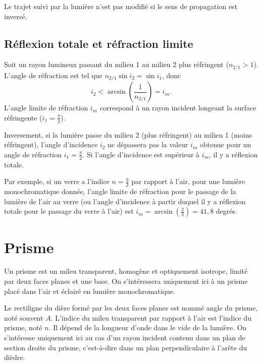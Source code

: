 \begin{theo}
  Le trajet suivi par la lumière n'est pas modifié si le sens de propagation est inversé.
\end{theo}

\subsection{Réflexion totale et réfraction limite}
\label{chap6-subsec:reftotale}
Soit un rayon lumineux passant du milieu 1 au milieu 2 plus réfringent ($n_{2/1}>1$). L'angle de réfraction est tel que $n_{2/1} \sin i_2 = \sin i_1$, donc
\begin{equation}
  i_2 < \arcsin \left(\frac{1}{n_{2/1}} \right) = i_m.
\end{equation}
L'angle limite de réfraction $i_m$ correspond à un rayon incident longeant la surface réfringente ($i_1 = \frac{\pi}{2}$).

Inversement, si la lumière passe du milieu 2 (plus réfringent) au milieu 1 (moins réfringent), l'angle d'incidence $i_2$ ne dépassera pas la valeur $i_m$ obtenue pour un angle de réfraction $i_1 = \frac{\pi}{2}$. Si l'angle d'incidence est supérieur à $i_m$, il y a réflexion totale.

Par exemple, si un verre a l'indice $n=\frac{3}{2}$ par rapport à l'air, pour une lumière monochromatique donnée, l'angle limite de réfraction pour le passage de la lumière de l'air au verre (ou l'angle d'incidence à partir duquel il y a réflexion totale pour le passage du verre à l'air) est $i_m = \arcsin\left(\frac{2}{3}\right) = 41,8$
 degrés.
\section{Prisme}
\label{chap6-sec:prisme}

Un prisme est un mileu transparent, homogène et optiquement isotrope, limité par deux faces planes et une base. On s'intéressera uniquement ici à un prisme placé dans l'air et éclairé en lumière monochromatique.

Le rectiligne du dière formé par les deux faces planes est nommé angle du prisme, noté souvent $A$. L'indice du mileu transparent par rapport à l'air est l'indice du prisme, noté $n$. Il dépend de la longueur d'onde dans le vide de la lumière. On s'intéresse uniquement ici au cas d'un rayon incident contenu dans un plan de section droite du prisme, c'est-à-dire dans un plan perpendiculaire à l'arête du dièdre.

